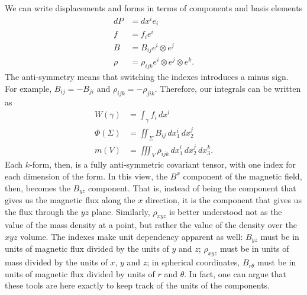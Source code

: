 We can write displacements and forms in terms of components and basis elements
\begin{equation}
	\begin{aligned}
	dP &= dx^i e_i \\
		f &= f_i e^i \\
		B &= B_{ij} e^i \otimes e^j \\
		\rho &= \rho_{ijk} e^i \otimes e^j \otimes e^k.
	\end{aligned}
\end{equation}
The anti-symmetry means that switching the indexes introduces a minus sign. For example, $B_{ij} = - B_{ji}$ and $\rho_{ijk} = - \rho_{jik}$. Therefore, our integrals can be written as
\begin{equation}
	\begin{aligned}
		W(\gamma) &= \int_\gamma f_i \, dx^i \\
		\Phi(\Sigma) &= \iint_\Sigma B_{ij} \, dx_1^i \, dx_2^j \\
		m(V) &= \iiint_V \rho_{ijk} \, dx_1^i \, dx_2^j \, dx_3^k.
	\end{aligned}
\end{equation}
Each $k$-form, then, is a fully anti-symmetric covariant tensor, with one index for each dimension of the form. In this view, the $B^x$ component of the magnetic field, then, becomes the $B_{yz}$ component. That is, instead of being the component that gives us the magnetic flux along the $x$ direction, it is the component that gives us the flux through the $yz$ plane. Similarly, $\rho_{xyz}$ is better understood not as the value of the mass density at a point, but rather the value of the density over the $xyz$ volume. The indexes make unit dependency apparent as well: $B_{yz}$ must be in units of magnetic flux divided by the units of $y$ and $z$; $\rho_{xyz}$ must be in units of mass divided by the units of $x$, $y$ and $z$; in spherical coordinates, $B_{r\theta}$ must be in units of magnetic flux divided by units of $r$ and $\theta$. In fact, one can argue that these tools are here exactly to keep track of the units of the components.

